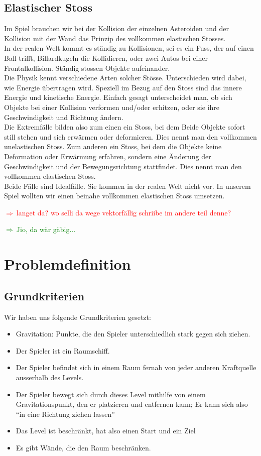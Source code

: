 \documentclass[12pt,a4paper]{scrartcl}
\newcommand{\q}[1]{``#1''}
\newcommand{\todo}[1]{\begin{Large}\textcolor{red}{$\Rightarrow ~$#1}\end{Large}}
\newcommand{\ant}[1]{\begin{Large}\textcolor{green}{$\Rightarrow ~$#1}\end{Large}}
\begin{document}
\subsection{Elastischer Stoss}
Im Spiel brauchen wir bei der Kollision der einzelnen Asteroiden und der Kollision mit der Wand das Prinzip des vollkommen elastischen Stosses. \\
In der realen Welt kommt es ständig zu Kollisionen, sei es ein Fuss, der auf einen Ball trifft, Billardkugeln die Kollidieren, oder zwei Autos bei einer Frontalkollision. 
Ständig stossen Objekte aufeinander. \\
Die Physik kennt verschiedene Arten solcher Stösse.
Unterschieden wird dabei, wie Energie übertragen wird.
Speziell im Bezug auf den Stoss sind das innere Energie und kinetische Energie.
Einfach gesagt unterscheidet man, ob sich Objekte bei einer Kollision verformen und/oder erhitzen, oder sie ihre Geschwindigkeit und Richtung ändern.\\
Die Extremfälle bilden also zum einen ein Stoss, bei dem Beide Objekte sofort still stehen und sich erwärmen oder deformieren.
Dies nennt man den vollkommen unelastischen Stoss.
Zum anderen ein Stoss, bei dem die Objekte keine Deformation oder Erwärmung erfahren, sondern eine Änderung der Geschwindigkeit und der Bewegungsrichtung stattfindet.
Dies nennt man den vollkommen elastischen Stoss.\\
Beide Fälle sind Idealfälle.
Sie kommen in der realen Welt nicht vor.
In unserem Spiel wollten wir einen beinahe vollkommen elastischen Stoss umsetzen.
\todo{langet da? wo selli da wege vektorfällig schriibe im andere teil denne?}
\ant{Jio, da wär gäbig...}




\section{Problemdefinition}
\subsection{Grundkriterien}
Wir haben uns folgende Grundkriterien gesetzt:
\begin{itemize}
\item Gravitation: Punkte, die den Spieler unterschiedlich stark gegen sich ziehen.
\item Der Spieler ist ein Raumschiff.
\item Der Spieler befindet sich in einem Raum fernab von jeder anderen Kraftquelle ausserhalb des Levels.
\item Der Spieler bewegt sich durch dieses Level mithilfe von  einem Gravitationspunkt, den er platzieren und entfernen kann; Er kann sich also \q{in eine Richtung ziehen lassen}
\item Das Level ist beschränkt, hat also einen Start und ein Ziel
\item Es gibt Wände, die den Raum beschränken.
\end{itemize}
\end{document}

